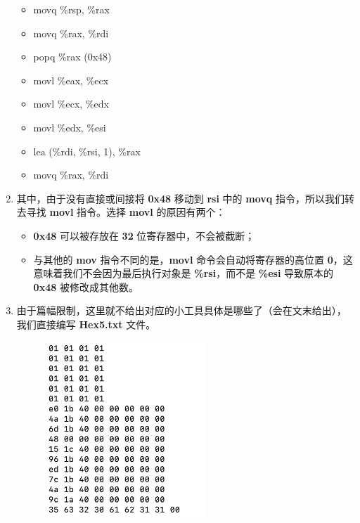 \begin{enumerate}
            \begin{itemize}
                \item movq \%rsp, \%rax
                \item movq \%rax, \%rdi
                \item popq \%rax (0x48)
                \item movl \%eax, \%ecx
                \item movl \%ecx, \%edx
                \item movl \%edx, \%esi
                \item lea (\%rdi, \%rsi, 1), \%rax
                \item movq \%rax, \%rdi
            \end{itemize}
            \item 其中，由于没有直接或间接将 \textbf{0x48} 移动到 \textbf{rsi} 中的 \textbf{movq} 指令，所以我们转去寻找 \textbf{movl} 指令。选择 \textbf{movl} 的原因有两个：
                \begin{itemize}
                    \item \textbf{0x48} 可以被存放在 \textbf{32} 位寄存器中，不会被截断；
                    \item 与其他的 \textbf{mov} 指令不同的是，\textbf{movl} 命令会自动将寄存器的高位置 \textbf{0}，这意味着我们不会因为最后执行对象是 \textbf{\%rsi}，而不是 \textbf{\%esi} 导致原本的 \textbf{0x48} 被修改成其他数。
                \end{itemize}
            \item 由于篇幅限制，这里就不给出对应的小工具具体是哪些了（会在文末给出），我们直接编写 \textbf{Hex5.txt} 文件。
                \begin{figure}[htbp]
                    \hspace*{1.5cm}
                    \includegraphics*[width = 6cm]{s5_1.png}
                \end{figure}

\end{enumerate}
